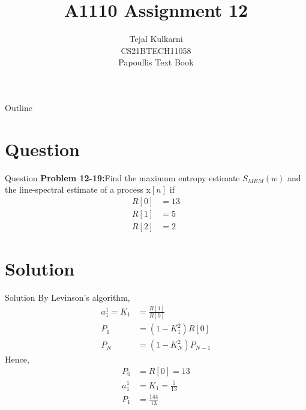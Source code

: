 \documentclass{beamer}
\title{A1110 Assignment 12 }
\author{Tejal Kulkarni \\ CS21BTECH11058 \\\vspace*{20pt} Papoullis Text Book }
\begin{document}
\providecommand{\pr}[1]{\ensuremath{\Pr\left(#1\right)}}
\providecommand{\cdf}[2]{\ensuremath{\text{F}_{#1}\left(#2\right)}}
\providecommand{\qfunc}[1]{\ensuremath{Q\left(#1\right)}}
\providecommand{\sbrak}[1]{\ensuremath{{}\left[#1\right]}}
\providecommand{\lsbrak}[1]{\ensuremath{{}\left[#1\right.}}
\providecommand{\rsbrak}[1]{\ensuremath{{}\left.#1\right]}}
\providecommand{\brak}[1]{\ensuremath{\left(#1\right)}}
\providecommand{\lbrak}[1]{\ensuremath{\left(#1\right.}}
\providecommand{\rbrak}[1]{\ensuremath{\left.#1\right)}}
\providecommand{\cbrak}[1]{\ensuremath{\left\{#1\right\}}}
\providecommand{\lcbrak}[1]{\ensuremath{\left\{#1\right.}}
\providecommand{\rcbrak}[1]{\ensuremath{\left.#1\right\}}}
\newcommand*{\permcomb}[4][0mu]{{{}^{#3}\mkern#1#2_{#4}}}
\newcommand*{\perm}[1][-3mu]{\permcomb[#1]{P}}
\newcommand*{\comb}[1][-1mu]{\permcomb[#1]{C}}
\renewcommand{\thetable}{\arabic{table}} 

\begin{frame}
    \titlepage
\end{frame}

\begin{frame}{Outline}
  \tableofcontents
\end{frame}

\section{Question}
\begin{frame}{Question}
\textbf{Problem 12-19:}Find the maximum entropy estimate $S_{MEM}\brak{w}$ and the line-spectral estimate of a process x\sbrak{n} if 
\begin{align}
    R\sbrak{0} &= 13 \\
    R\sbrak{1} &= 5 \\
    R\sbrak{2} &= 2
\end{align}
\end{frame}

\section{Solution}
\begin{frame}{Solution}
By Levinson's algorithm,
\begin{align}
    a_1^1 = K_1 &= \frac{R\sbrak{1}}{R\sbrak{0}} \\
    P_1 &= \brak{1 - K_1^2}R\sbrak{0} \\
    P_N &= \brak{1 - K_N^2}P_{N-1} \label{Eq:6}
\end{align}
Hence,
\begin{align}
    P_0 &= R\sbrak{0} = 13 \\
    a_1^1 &= K_1 = \frac{5}{13} \\
    P_1 &= \frac{144}{13}
\end{align}
\end{frame}
\end{document}

